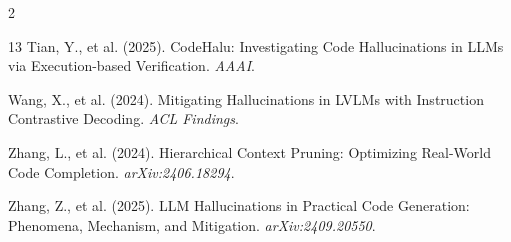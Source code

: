 \documentclass[11pt,a4paper]{article}
\begin{document}
\begin{multicols}{2}
\begin{thebibliography}{13}
Tian, Y., et al. (2025).
\newblock CodeHalu: Investigating Code Hallucinations in LLMs via Execution-based Verification.
\newblock \textit{AAAI}.

Wang, X., et al. (2024).
\newblock Mitigating Hallucinations in LVLMs with Instruction Contrastive Decoding.
\newblock \textit{ACL Findings}.

Zhang, L., et al. (2024).
\newblock Hierarchical Context Pruning: Optimizing Real-World Code Completion.
\newblock \textit{arXiv:2406.18294}.

Zhang, Z., et al. (2025).
\newblock LLM Hallucinations in Practical Code Generation: Phenomena, Mechanism, and Mitigation.
\newblock \textit{arXiv:2409.20550}.

\end{thebibliography}

\end{multicols}
\end{document}
